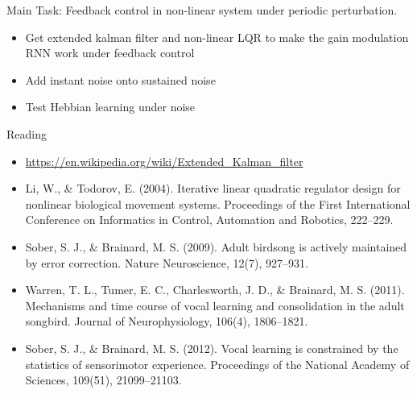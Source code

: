 \documentclass[12pt, a4paper]{article}
\begin{document}
\noindent
Main Task: Feedback control in non-linear system under periodic perturbation.

\begin{itemize}
    \item Get extended kalman filter and non-linear LQR to make the gain modulation RNN work under feedback control
    \item Add instant noise onto sustained noise
    \item Test Hebbian learning under noise
\end{itemize}

\noindent
Reading

\begin{itemize}
    \item \url{https://en.wikipedia.org/wiki/Extended_Kalman_filter}
    \item Li, W., \& Todorov, E. (2004). Iterative linear quadratic regulator design for nonlinear biological movement systems. Proceedings of the First International Conference on Informatics in Control, Automation and Robotics, 222–229.
    \item Sober, S. J., \& Brainard, M. S. (2009). Adult birdsong is actively maintained by error correction. Nature Neuroscience, 12(7), 927–931.
    \item Warren, T. L., Tumer, E. C., Charlesworth, J. D., \& Brainard, M. S. (2011). Mechanisms and time course of vocal learning and consolidation in the adult songbird. Journal of Neurophysiology, 106(4), 1806–1821.
    \item Sober, S. J., \& Brainard, M. S. (2012). Vocal learning is constrained by the statistics of sensorimotor experience. Proceedings of the National Academy of Sciences, 109(51), 21099–21103.
\end{itemize}

\newpage
\end{document}
